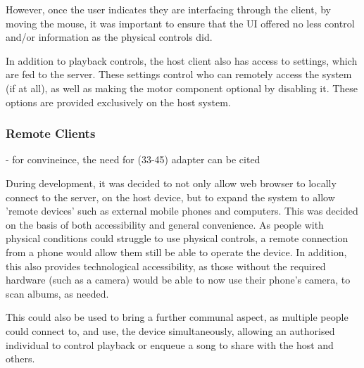                 However, once the user indicates they are interfacing through the client, by moving the mouse, it was important to ensure that the UI offered no less control and/or information as the physical controls did.
    
                In addition to playback controls, the host client also has access to settings, which are fed to the server. These settings control who can remotely access the system (if at all), as well as making the motor component optional by disabling it. These options are provided exclusively on the host system.
        
            \subsubsection{Remote Clients}
    
                \begin{temp}
                    - for convineince, the need for (33-45) adapter  can be cited
                \end{temp}
    
                During development, it was decided to not only allow web browser to locally connect to the server, on the host device, but to expand the system to allow 'remote devices' such as external mobile phones and computers. This was decided on the basis of both accessibility and general convenience. As people with physical conditions could struggle to use physical controls, a remote connection from a phone would allow them still be able to operate the device. In addition, this also provides technological accessibility, as those without the required hardware (such as a camera) would be able to now use their phone's camera, to scan albums, as needed.
    
                This could also be used to bring a further communal aspect, as multiple people could connect to, and use, the device simultaneously, allowing an authorised individual to control playback or enqueue a song to share with the host and others.
    
